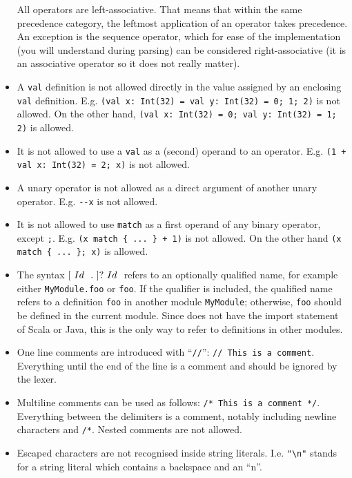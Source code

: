 \begin{itemize}
        All operators are left-associative. That means that within
        the same precedence category, the leftmost application of an operator takes precedence.
        An exception is the sequence operator, which for ease of the implementation
        (you will understand during parsing)
        can be considered right-associative (it is an associative operator so it does not really
        matter).
    \item A \lstinline{val} definition is not allowed directly in the value assigned
        by an enclosing \lstinline{val} definition.
        E.g. \lstinline{(val x: Int(32) = val y: Int(32) = 0; 1; 2)} is not allowed.
        On the other hand, \lstinline{(val x: Int(32) = 0; val y: Int(32) = 1; 2)} is allowed.
    \item It is not allowed to use a \lstinline{val} as a (second) operand to an operator.
        E.g. \lstinline{(1 + val x: Int(32) = 2; x)} is not allowed.
    \item A unary operator is not allowed as a direct argument of another unary operator.
        E.g. \lstinline{--x} is not allowed.
    \item It is not allowed to use \lstinline{match} as a first operand of any binary operator,
        except \lstinline{;}. E.g. \lstinline|(x match { ... } + 1)| is not allowed.
        On the other hand \lstinline|(x match { ... }; x)| is allowed.
    \item The syntax $[~Id~ ~.~]? ~Id~$ refers to an optionally qualified name,
        for example either \lstinline{MyModule.foo} or \lstinline{foo}.
        If the qualifier is included, the qualified name refers to a definition
        \lstinline{foo} in another module \lstinline{MyModule};
        otherwise, \lstinline{foo} should be defined in the current module.
        Since \langname does not have the import statement of Scala or Java,
        this is the only way to refer to definitions in other modules.
	\item One line comments are introduced with ``\lstinline{//}'': \lstinline{// This is a comment}.
        Everything until the end of the line is a comment and should be ignored by the lexer.
    \item Multiline comments can be used as follows: \lstinline{/* This is a comment */}.
        Everything between the delimiters is a comment, notably including newline characters
        and \lstinline{/*}. Nested comments are not allowed.
    \item Escaped characters are not recognised inside string literals.
        I.e. \lstinline{"\n"} stands for a string literal which contains
        a backspace and an ``n''.
\end{itemize}

